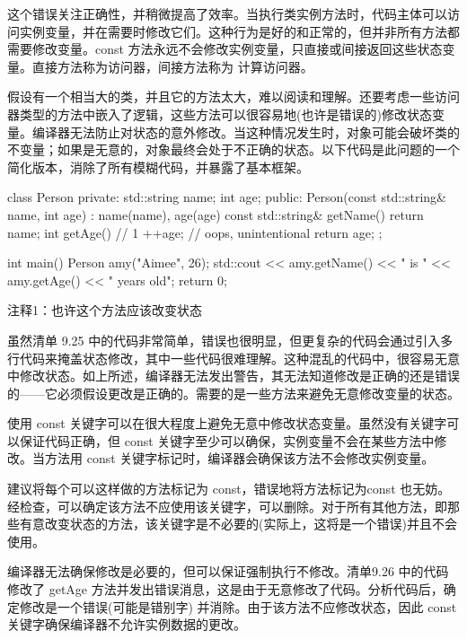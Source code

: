 这个错误关注正确性，并稍微提高了效率。当执行类实例方法时，代码主体可以访问实例变量，并在需要时修改它们。这种行为是好的和正常的，但并非所有方法都需要修改变量。const 方法永远不会修改实例变量，只直接或间接返回这些状态变量。直接方法称为访问器，间接方法称为 计算访问器。


假设有一个相当大的类，并且它的方法太大，难以阅读和理解。还要考虑一些访问器类型的方法中嵌入了逻辑，这些方法可以很容易地(也许是错误的)修改状态变量。编译器无法防止对状态的意外修改。当这种情况发生时，对象可能会破坏类的不变量；如果是无意的，对象最终会处于不正确的状态。以下代码是此问题的一个简化版本，消除了所有模糊代码，并暴露了基本框架。


\begin{cpp}
class Person {
private:
  std::string name;
  int age;
public:
  Person(const std::string& name, int age) : name(name), age(age) {}
  const std::string& getName() { return name; }
  int getAge() { // 1
    ++age; // oops, unintentional
    return age;
  }
};

int main() {
  Person amy("Aimee", 26);
  std::cout << amy.getName() << " is " << amy.getAge() << " years old\n";
  return 0;
}
\end{cpp}

{\footnotesize
注释1：也许这个方法应该改变状态
}


虽然清单 9.25 中的代码非常简单，错误也很明显，但更复杂的代码会通过引入多行代码来掩盖状态修改，其中一些代码很难理解。这种混乱的代码中，很容易无意中修改状态。如上所述，编译器无法发出警告，其无法知道修改是正确的还是错误的——它必须假设更改是正确的。需要的是一些方法来避免无意修改变量的状态。


使用 const 关键字可以在很大程度上避免无意中修改状态变量。虽然没有关键字可以保证代码正确，但 const 关键字至少可以确保，实例变量不会在某些方法中修改。当方法用 const 关键字标记时，编译器会确保该方法不会修改实例变量。

建议将每个可以这样做的方法标记为 const，错误地将方法标记为const 也无妨。经检查，可以确定该方法不应使用该关键字，可以删除。对于所有其他方法，即那些有意改变状态的方法，该关键字是不必要的(实际上，这将是一个错误)并且不会使用。

编译器无法确保修改是必要的，但可以保证强制执行不修改。清单9.26 中的代码修改了 getAge 方法并发出错误消息，这是由于无意修改了代码。分析代码后，确定修改是一个错误(可能是错别字) 并消除。由于该方法不应修改状态，因此 const 关键字确保编译器不允许实例数据的更改。

